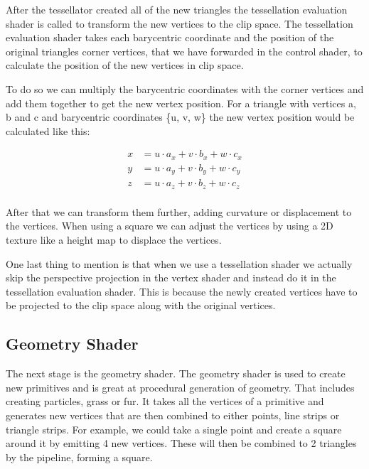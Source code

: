 \documentclass[12pt]{report} \usepackage{preamble}
\begin{document}
After the tessellator created all of the new triangles the tessellation evaluation shader
is called to transform the new vertices to the clip space.
The tessellation evaluation shader takes each barycentric coordinate
and the position of the original triangles corner vertices, that we have forwarded in
the control shader, to calculate the position of the new vertices in clip space. \cite{tessellation}

To do so we can multiply the barycentric coordinates with the corner vertices
and add them together to get the new vertex position.
For a triangle with vertices a, b and c and barycentric coordinates \{u, v, w\}
the new vertex position would be calculated like this:

\[
	\begin{aligned}
		x & = u \cdot a_x + v \cdot b_x + w \cdot c_x \\
		y & = u \cdot a_y + v \cdot b_y + w \cdot c_y \\
		z & = u \cdot a_z + v \cdot b_z + w \cdot c_z \\
	\end{aligned}
\]

After that we can transform them further, adding curvature or displacement to the vertices.
When using a square we can adjust the vertices
by using a 2D texture like a height map to displace the vertices. \cite{tessellation}

One last thing to mention is that when we use a tessellation shader
we actually skip the perspective projection in the vertex shader and
instead do it in the tessellation evaluation shader.
This is because the newly created vertices have to be projected to the clip space
along with the original vertices. \cite{tessellation}

\subsection{Geometry Shader}

The next stage is the geometry shader. The geometry shader is used to create new
primitives and is great at procedural generation of geometry.
That includes creating particles, grass or fur. It takes all the vertices of a primitive
and generates new vertices that are then combined to
either points, line strips or triangle strips.
For example, we could take a single point and create a square around it by emitting 4 new vertices.
These will then be combined to 2 triangles by the pipeline, forming a square. \cite{geometry-shader}
\end{document}
